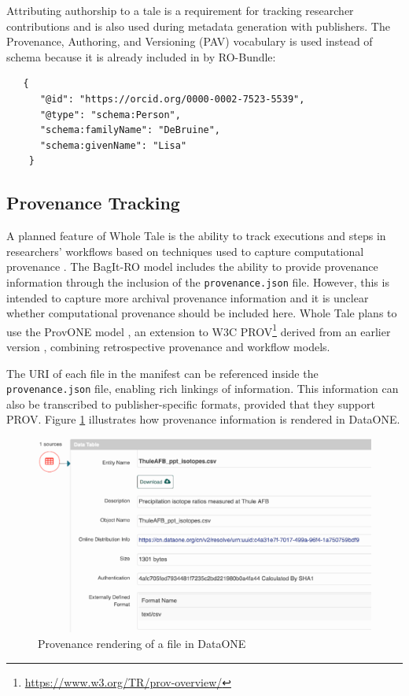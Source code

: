 \documentclass[conference]{IEEEtran}
\begin{document}
Attributing authorship to a tale is a requirement for tracking researcher contributions and is also used during metadata generation with publishers. The Provenance, Authoring, and Versioning (PAV) vocabulary is used instead of schema because it is already included in by RO-Bundle: 

\begin{lstlisting}
   {
      "@id": "https://orcid.org/0000-0002-7523-5539",
      "@type": "schema:Person",
      "schema:familyName": "DeBruine",
      "schema:givenName": "Lisa"
    }
\end{lstlisting}
		
		
\subsection{Provenance Tracking}

A planned feature of Whole Tale is the ability to track executions and
steps in researchers' workflows based on techniques used to capture
computational provenance
\cite{mcphillips2015retrospective,Chirigati2016,That2017,Yuan2018}. 
The BagIt-RO model includes the ability to provide provenance
information through the inclusion of the \texttt{provenance.json}
file. However, this is intended to capture more archival provenance
information and it is unclear whether computational provenance should
be included here. 
Whole Tale plans to use the ProvONE model \cite {ProvONE}, an
extension to W3C
PROV\footnote{\url{https://www.w3.org/TR/prov-overview/}} derived from
an earlier version \cite{missier2013dprov}, combining retrospective
provenance and workflow models.

The URI of each file in the manifest can be referenced inside the
\texttt{provenance.json} file, enabling rich linkings of
information. This information can also be transcribed to
publisher-specific formats, provided that they support PROV. Figure
\ref{prov-fig} illustrates how provenance information is rendered in
DataONE.

\begin{figure}
\centering
\includegraphics[scale=0.4]{images/dataone-prov.png}
\caption{Provenance rendering of a file in DataONE}
\label{prov-fig}
\end{figure}
\end{document}
